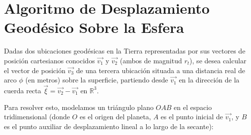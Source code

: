 \documentclass[12pt,a4paper]{article}
\begin{document}
\section{Algoritmo de Desplazamiento Geodésico Sobre la Esfera}

Dadas dos ubicaciones geodésicas en la Tierra representadas por sus vectores de posición cartesianos conocidos $\vec{v_1}$ y $\vec{v_2}$ (ambos de magnitud $r_t$), se desea calcular el vector de posición $\vec{v_3}$ de una tercera ubicación situada a una distancia real de arco $\phi$ (en metros) sobre la superficie, partiendo desde $\vec{v_1}$ en la dirección de la cuerda recta $\vec{\xi} = \vec{v_2} - \vec{v_1}$ en $\mathbb{R}^3$.

Para resolver esto, modelamos un triángulo plano $OAB$ en el espacio tridimensional (donde $O$ es el origen del planeta, $A$ es el punto inicial de $\vec{v_1}$, y $B$ es el punto auxiliar de desplazamiento lineal a lo largo de la secante):
\end{document}

